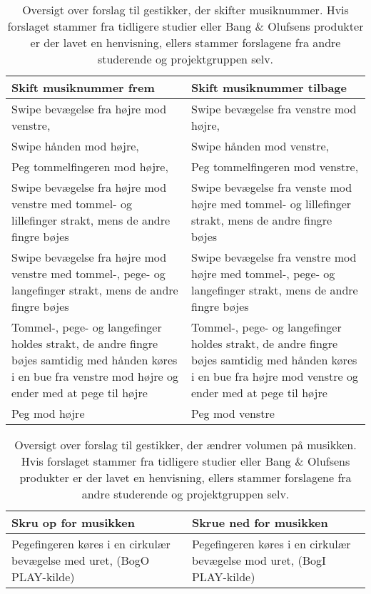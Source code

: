\begin{table}[H]
	\centering
	\begin{tabular}{| p{6cm} | p{6cm} |}
		\hline
		\textbf{Skift musiknummer frem} & \textbf{Skift musiknummer tilbage} \\ \hline
		Swipe bevægelse fra højre mod venstre, \parencite[s. 48]{PDF:UserDefinedGesturesTV; WEB:Beosound2; WEB:BeosoundMoment} & Swipe bevægelse fra venstre mod højre, \parencite[s. 48]{PDF:UserDefinedGesturesTV} \\ \hline
		Swipe hånden mod højre, \parencite[s. 166]{PDF:ComparingInputModalities}  & Swipe hånden mod venstre, \parencite[s. 166]{PDF:ComparingInputModalities}  \\ \hline
		Peg tommelfingeren mod højre, \parencite[s. 166]{PDF:ComparingInputModalities} & Peg tommelfingeren mod venstre, \parencite[s. 166]{PDF:ComparingInputModalities} \\ \hline
		Swipe bevægelse fra højre mod venstre med tommel- og lillefinger strakt, mens de andre fingre bøjes & Swipe bevægelse fra venste mod højre med tommel- og lillefinger strakt, mens de andre fingre bøjes \\ \hline
		Swipe bevægelse fra højre mod venstre med tommel-, pege- og langefinger strakt, mens de andre fingre bøjes & Swipe bevægelse fra venstre mod højre med tommel-, pege- og langefinger strakt, mens de andre fingre bøjes \\ \hline
		Tommel-, pege- og langefinger holdes strakt, de andre fingre bøjes samtidig med hånden køres i en bue fra venstre mod højre og ender med at pege til højre & Tommel-, pege- og langefinger holdes strakt, de andre fingre bøjes samtidig med hånden køres i en bue fra højre mod venstre og ender med at pege til højre\\ \hline
		Peg mod højre & Peg mod venstre
		
		
	\end{tabular}
	\caption{Oversigt over forslag til gestikker, der skifter musiknummer. Hvis forslaget stammer fra tidligere studier eller Bang $\&$ Olufsens produkter er der lavet en henvisning, ellers stammer forslagene fra andre studerende og projektgruppen selv.}
	\label{tab:IndsamledeGestikkerSkift}
\end{table}
\noindent

\begin{table}[H]
	\centering
	\begin{tabular}{| p{6cm} | p{6cm} |}
		\hline
		\textbf{Skru op for musikken} & \textbf{Skrue ned for musikken} \\ \hline
		Pegefingeren køres i en cirkulær bevægelse med uret, (BogO PLAY-kilde) & Pegefingeren køres i en cirkulær bevægelse mod uret, (BogI PLAY-kilde) \\ \hline
		 
		
		
	\end{tabular}
	\caption{Oversigt over forslag til gestikker, der ændrer volumen på musikken. Hvis forslaget stammer fra tidligere studier eller Bang $\&$ Olufsens produkter er der lavet en henvisning, ellers stammer forslagene fra andre studerende og projektgruppen selv.}
	\label{tab:IndsamledeGestikkerVolumen}
\end{table}
\noindent

